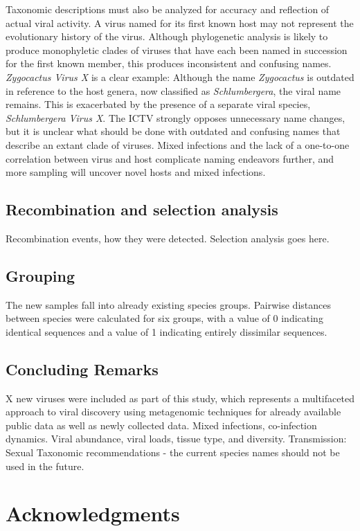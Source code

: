 \documentclass[fleqn,10pt,lineno]{wlpeerj}
\begin{document}
Taxonomic descriptions must also be analyzed for accuracy and reflection of actual viral activity. 
A virus named for its first known host may not represent the evolutionary history of the virus.
Although phylogenetic analysis is likely to produce monophyletic clades of viruses that have each been named in succession for the first known member, this produces inconsistent and confusing names.
\textit{Zygocactus Virus X} is a clear example: Although the name \textit{Zygocactus} is outdated in reference to the host genera, now classified as \textit{Schlumbergera}, the viral name remains.
This is exacerbated by the presence of a separate viral species, \textit{Schlumbergera Virus X}.
The ICTV strongly opposes unnecessary name changes, but it is unclear what should be done with outdated and confusing names that describe an extant clade of viruses.
Mixed infections and the lack of a one-to-one correlation between virus and host complicate naming endeavors further, and more sampling will uncover novel hosts and mixed infections.

\subsection*{Recombination and selection analysis}
Recombination events, how they were detected.
Selection analysis goes here.

\subsection*{Grouping}
The new samples fall into already existing species groups.
Pairwise distances between species were calculated for six groups, with a value of 0 indicating identical sequences and a value of 1 indicating entirely dissimilar sequences.

\subsection*{Concluding Remarks}
X new viruses were included as part of this study, which represents a multifaceted approach to viral discovery using metagenomic techniques for already available public data as well as newly collected data.
Mixed infections, co-infection dynamics.
Viral abundance, viral loads, tissue type, and diversity.
Transmission: Sexual
Taxonomic recommendations - the current species names should not be used in the future.
\section*{Acknowledgments}
\end{document}
